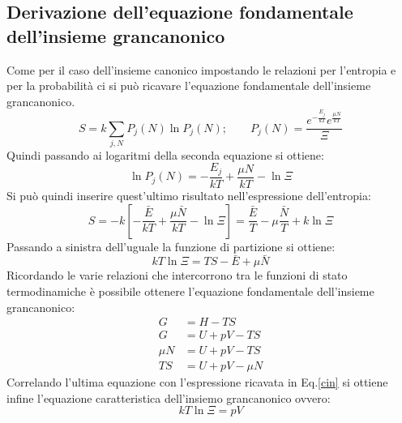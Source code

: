 \documentclass[oneside]{amsbook}
\numberwithin{section}{chapter}
\numberwithin{equation}{section}
\numberwithin{figure}{section}
\begin{document}
\subsection{Derivazione dell'equazione fondamentale dell'insieme grancanonico}
Come per il caso dell'insieme canonico impostando le relazioni per l'entropia e per la probabilità ci si può ricavare l'equazione fondamentale dell'insieme grancanonico.
\begin{equation}
S= k  \sum_{j,N}P_j(N) \ln P_j(N); \quad \quad P_j(N)=\frac{e^{-\frac{E_j}{kT}}e^{\frac{\mu N}{kT}}}{\Xi}
\end{equation}
Quindi passando ai logaritmi della seconda equazione si ottiene:
\begin{equation}
\ln P_j(N) = -\frac{E_j}{kT}+\frac{\mu N}{kT}-\ln \Xi
\end{equation}
Si può quindi inserire quest'ultimo risultato nell'espressione dell'entropia:
\begin{equation}
S= -k \left[ -\frac{\bar{E}}{kT}+ \frac{\mu \bar{N}}{kT}-\ln \Xi\right]= \frac{\bar{E}}{T}-\mu \frac{ \bar{N}}{T}+k\ln \Xi\end{equation}
Passando a sinistra dell'uguale la funzione di partizione si ottiene:
\begin{equation}
\label{cin}
kT \ln \Xi = TS - \bar{E} + \mu\bar{N}
\end{equation}
Ricordando le varie relazioni che intercorrono tra le funzioni di stato termodinamiche è possibile ottenere l'equazione fondamentale dell'insieme grancanonico:
\begin{equation}
\begin{aligned}
G&=H-TS\\G&=U+pV-TS\\\mu N&=U+pV-TS\\TS&=U+pV-\mu N
\end{aligned}
\end{equation}
Correlando l'ultima equazione con l'espressione ricavata in Eq.\ref{cin} si ottiene infine l'equazione caratteristica dell'insiemo grancanonico ovvero:
\begin{equation}
kT\ln \Xi=pV
\end{equation}
\end{document}
